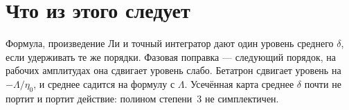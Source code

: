 \documentclass[a4paper,11pt]{article}
\begin{document}










\section{Что из этого следует}
Формула, произведение Ли и точный интегратор дают один уровень среднего $\delta$, если удерживать те же порядки. Фазовая поправка --- следующий порядок, на рабочих амплитудах она сдвигает уровень слабо. Бетатрон сдвигает уровень на $-\Lambda/\eta_0$, и среднее садится на формулу с $\Lambda$. Усечённая карта среднее $\delta$ почти не портит и портит действие: полином степени~3 не симплектичен.
\end{document}

